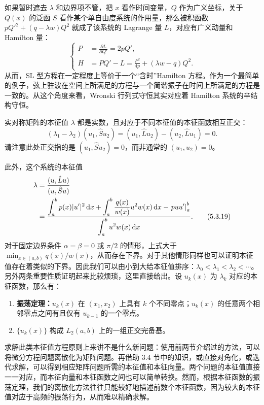 如果暂时遮去 $\lambda$ 和边界项不管，把 $x$ 看作时间变量，$Q$ 作为广义坐标，关于 $Q(x)$ 的泛函 $S$ 看作某个单自由度系统的作用量，那么被积函数 $pQ'^2+(q-\lambda w)Q^2$ 就成了该系统的 Lagrange 量 $L$，对应有广义动量和 Hamilton 量：
\begin{equation}
\left\{
\begin{aligned}
P&=\frac{\partial L}{\partial Q'}=2pQ',\\
H&=PQ'-L=\frac{P^2}{4p}+(\lambda w-q)Q^2.
\end{aligned}\right.
\tag{5.3.17}
\end{equation}
从而，SL 型方程在一定程度上等价于一个“含时”Hamilton 方程。作为一个最简单的例子，弦上驻波在空间上所满足的方程与一个简谐振子在时间上所满足的方程是一致的。从这个角度来看，Wronski 行列式守恒其实对应着 Hamilton 系统的辛结构守恒。

实对称矩阵的本征值 $\lambda$ 都是实数，且对应于不同本征值的本征函数相互正交：
\begin{equation}
(\lambda_1-\lambda_2)(u_1,\hat S u_2)
=(u_1,\hat L u_2)-(u_2,\hat L u_1)=0.
\tag{5.3.18}
\end{equation}
请注意此处正交指的是 $(u_1,\hat S u_2)=0$，而非通常的 $(u_1,u_2)=0$。

此外，这个系统的本征值
\begin{align}
\lambda
&=\frac{(u,\hat L u)}{(u,\hat S u)}\notag\\
&=\frac{\displaystyle\int_a^b p(x)|u'|^2\,\mathrm dx
+\displaystyle\int_a^b\frac{q(x)}{w(x)}u^2w(x)\,\mathrm dx
-\left.puu'\right|_a^b}
{\displaystyle\int_a^b u^2w(x)\,\mathrm dx}.
\tag{5.3.19}
\end{align}
对于固定边界条件 $\alpha=\beta=0$ 或 $\pi/2$ 的情形，上式大于 $\min_{x\in(a,b)}q(x)/w(x)$，从而存在下界。对于其他情形同样也可以证明本征值存在着类似的下界。因此我们可以由小到大给本征值排序：$\lambda_0<\lambda_1<\lambda_2<\cdots$。另外两条重要性质证明起来比较烦琐，这里直接给出。设 $u_k(x)$ 为 $\lambda_k$ 对应的本征函数，那么有：
\begin{enumerate}[label=(\arabic*)]
\item \textbf{振荡定理：}$u_k(x)$ 在 $(x_1,x_2)$ 上具有 $k$ 个不同零点；$u_k(x)$ 的任意两个相邻零点之间有且仅有 $u_{k-1}$ 的一个零点。
\item $\{u_k(x)\}$ 构成 $L_2(a,b)$ 上的一组正交完备基。
\end{enumerate}
求解此类本征值方程原则上来讲不是什么新问题：使用前两节介绍过的方法，可以将微分方程问题离散化为矩阵问题。再借助 3.4 节中的知识，或直接对角化，或迭代求解，可以得到相应矩阵问题所需的本征值和本征向量。两个问题的本征值直接一一对应，而本征向量和本征函数之间也可以简单转换。然而，根据本征函数的振荡定理，我们的离散化方法往往只能较好地描述前数个本征函数，因为较大的本征值对应于高频的振荡行为，从而难以精确求解。

